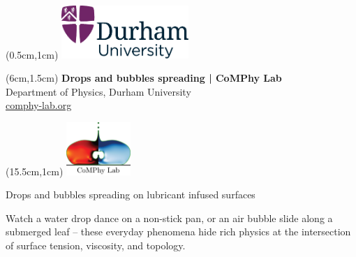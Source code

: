 \documentclass[11pt]{article}
\newlength{\headertobodysep}
\begin{document}
\thispagestyle{empty}

\textblockorigin{0pt}{0pt}

\begin{textblock*}{5cm}(0.5cm,1cm)
    \includegraphics[height=2cm]{../_logosAndRef/Durham-University.pdf}
\end{textblock*}

\begin{textblock*}{9cm}(6cm,1.5cm)
    \centering
    {\large \textbf{Drops and bubbles spreading | CoMPhy Lab}}\\[0.2em]
    Department of Physics, Durham University\\[0.3em]
    \href{https://comphy-lab.org}{comphy-lab.org}
\end{textblock*}

\begin{textblock*}{5cm}(15.5cm,1cm) %
    \includegraphics[height=2cm]{../_logosAndRef/CoMPhy-Lab.png}
\end{textblock*}

\vspace*{\headertobodysep}

\begin{center}
    \begin{LARGE}
     Drops and bubbles spreading on lubricant infused surfaces
    \end{LARGE}
\end{center}

\noindent Watch a water drop dance on a non-stick pan, or an air bubble slide along a submerged leaf -- these everyday phenomena hide rich physics at the intersection of surface tension, viscosity, and topology.
\end{document}
